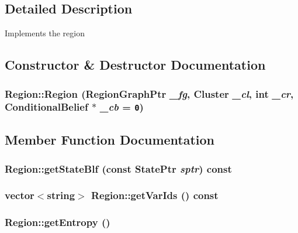 \subsection{Detailed Description}
Implements the region 



\subsection{Constructor \& Destructor Documentation}
\subsubsection{\setlength{\rightskip}{0pt plus 5cm}Region::Region ({\bf RegionGraphPtr} {\em \_\-fg}, {\bf Cluster} {\em \_\-cl}, int {\em \_\-cr}, {\bf ConditionalBelief} $\ast$ {\em \_\-cb} = {\tt 0})}\label{classRegion_a3c4e2d0fbd5b9337139294ff7db7550}




\subsection{Member Function Documentation}
\subsubsection{ Region::getStateBlf (const {\bf StatePtr} {\em sptr}) const}\label{classRegion_22cb607c718710a6486e7982c1870950}


\subsubsection{\setlength{\rightskip}{0pt plus 5cm}vector$<$string$>$ Region::getVarIds () const\hspace{0.3cm}{\tt  [inline]}}\label{classRegion_70b5d23ef485e9ead4a2d8ab4e8e6ba7}


\subsubsection{ Region::getEntropy ()}\label{classRegion_6b6838f67aac3480cd9d6479159825ff}


